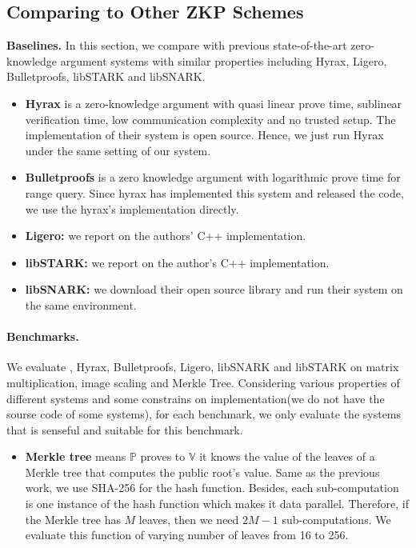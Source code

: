 \subsection{Comparing to Other ZKP Schemes}\label{subsec:expZKP}
\textbf{Baselines.} In this section, we compare \name{} with previous state-of-the-art zero-knowledge argument systems with similar properties including Hyrax\cite{hyrax}, Ligero\cite{ligero}, Bulletproofs\cite{bulletproofs}, libSTARK\cite{libstark} and libSNARK\cite{libsnark}.
\begin{itemize}
\item
\textbf{Hyrax} is a zero-knowledge argument with quasi linear prove time, sublinear verification time, low communication complexity and no trusted setup. The implementation of their system is open source. Hence, we just run Hyrax under the same setting of our system.
\item
\textbf{Bulletproofs} is a zero knowledge argument with logarithmic prove time for range query. Since hyrax has implemented this system and released the code, we use the hyrax's implementation directly.
\item
\textbf{Ligero:} we report on the authors' C++ implementation.
\item
\textbf{libSTARK:} we report on the author's C++ implementation.
\item
\textbf{libSNARK:} we download their open source library and run their system on the same environment.
\end{itemize}
\paragraph{Benchmarks.} We evaluate \name{}, Hyrax, Bulletproofs, Ligero, libSNARK and libSTARK on matrix multiplication, image scaling and Merkle Tree\cite{merkletree}. Considering various properties of different systems and some constrains on implementation(\ie we do not have the sourse code of some systems), for each benchmark, we only evaluate the systems that is senseful and suitable for this benchmark.
\begin{itemize}
	\item
	\textbf{Merkle tree} means $\mathbb{P}$ proves to $\mathbb{V}$ it knows the value of the leaves of a Merkle tree\cite{merkletree} that computes the public root's value\cite{blum1994checking}. Same as the previous work, we use SHA-256 for the hash function. Besides, each sub-computation is one instance of the hash function which makes it data parallel. Therefore, if the Merkle tree has $M$ leaves, then we need $2M - 1$ sub-computations. We evaluate this function of varying number of leaves from 16 to 256.
\end{itemize}
